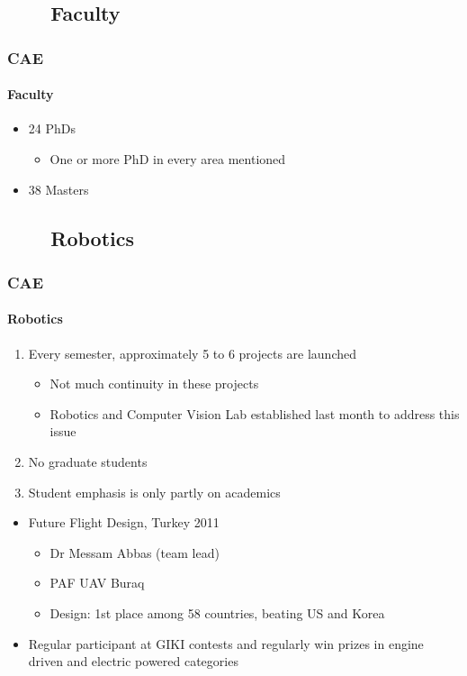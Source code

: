 \subsection{\ \ \ \ Faculty}
\begin{frame}
\frametitle{CAE}
\framesubtitle{Faculty}
\mypagenum{}
\begin{itemize}
\item 24 PhDs
\begin{itemize}
\item One or more PhD in every area mentioned
\end{itemize}
\item 38 Masters
\end{itemize}
\end{frame}



\subsection{\ \ \ \ Robotics}
\begin{frame}
\frametitle{CAE}
\framesubtitle{Robotics}
\mypagenum{}
\begin{enumerate}\scriptsize
\item Every semester, approximately 5 to 6 projects are launched 
\begin{itemize}\scriptsize
\item Not much continuity in these projects
\item Robotics and Computer Vision Lab established last month to address this issue
\end{itemize}
\item No graduate students
\item Student emphasis is only partly on academics
\end{enumerate}
\begin{itemize}
\item Future Flight Design, Turkey 2011
\begin{itemize}
\item Dr Messam Abbas (team lead)
\item PAF UAV Buraq
\item Design: 1st place among 58 countries, beating US and Korea
\end{itemize}
\item Regular participant at GIKI contests and regularly win prizes in engine driven and electric powered categories
\end{itemize}
\end{frame}




